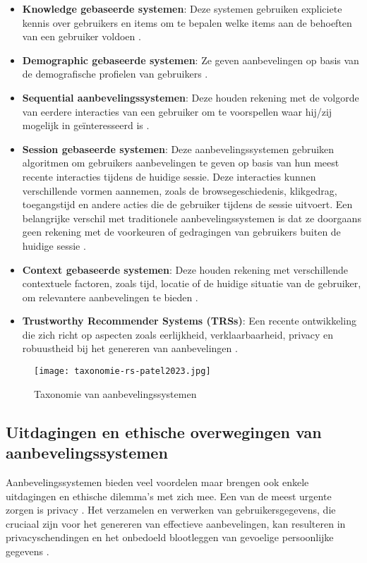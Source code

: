 \begin{itemize}
  \item \textbf{Knowledge gebaseerde systemen}: Deze systemen gebruiken expliciete kennis over gebruikers en items om te bepalen welke items aan de behoeften van een gebruiker voldoen \autocite{Patel2023}.
  \item \textbf{Demographic gebaseerde systemen}: Ze geven aanbevelingen op basis van de demografische profielen van gebruikers \autocite{Patel2023}.
  \item \textbf{Sequential aanbevelingssystemen}: Deze houden rekening met de volgorde van eerdere interacties van een gebruiker om te voorspellen waar hij/zij mogelijk in geïnteresseerd is \autocite{Patel2023, Zangerle2022}.
  \item \textbf{Session gebaseerde systemen}: Deze aanbevelingssystemen gebruiken algoritmen om gebruikers aanbevelingen te geven op basis van hun meest recente interacties tijdens de huidige sessie. Deze interacties kunnen verschillende vormen aannemen, zoals de browsegeschiedenis, klikgedrag, toegangstijd en andere acties die de gebruiker tijdens de sessie uitvoert. Een belangrijke verschil met traditionele aanbevelingssystemen is dat ze doorgaans geen rekening met de voorkeuren of gedragingen van gebruikers buiten de huidige sessie \autocite{Patel2023}. 
  \item \textbf{Context gebaseerde systemen}: Deze houden rekening met verschillende contextuele factoren, zoals tijd, locatie of de huidige situatie van de gebruiker, om relevantere aanbevelingen te bieden \autocite{Patel2023}.
  \item \textbf{Trustworthy Recommender Systems (TRSs)}: Een recente ontwikkeling die zich richt op aspecten zoals eerlijkheid, verklaarbaarheid, privacy en robuustheid bij het genereren van aanbevelingen \autocite{Wang2024}.
\end{itemize}
\begin{figure}
  \centering
  \texttt{[image: taxonomie-rs-patel2023.jpg]}
  \caption[Taxonomie van aanbevelingssystemen]{\label{fig:TaxonomieRS} Taxonomie van aanbevelingssystemen \autocite{Patel2023}}
\end{figure}
\subsection{Uitdagingen en ethische overwegingen van aanbevelingssystemen}
Aanbevelingssystemen bieden veel voordelen maar brengen ook enkele uitdagingen en ethische dilemma's met zich mee. Een van de meest urgente zorgen is privacy \autocite{Lex2023, Friedman2015, Li2017}. Het verzamelen en verwerken van gebruikersgegevens, die cruciaal zijn voor het genereren van effectieve aanbevelingen, kan resulteren in privacyschendingen en het onbedoeld blootleggen van gevoelige persoonlijke gegevens \autocite{Wang2018, Li2017}.

